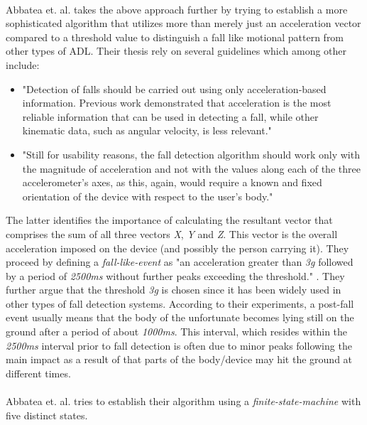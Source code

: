 \documentclass[12pt, a4paper, onecolumn]{article}
\begin{document}
	
	\paragraph{} Abbatea et. al. takes the above approach further by trying to establish a more sophisticated algorithm that utilizes more than merely just an acceleration vector compared to a threshold value to distinguish a fall like motional pattern from other types of ADL. Their thesis rely on several guidelines which among other include: 
	\begin{itemize} 
		\item "Detection of falls should be carried out using only acceleration-based information. Previous work demonstrated that acceleration is the most reliable information that can be used in detecting a fall, while other kinematic data, such as angular velocity, is less relevant." \cite[p~3]{piza_uni}
		
		\item "Still for usability reasons, the fall detection algorithm should work only with the magnitude of acceleration and not with the values along each of the three accelerometer’s axes, as this, again, would require a known and fixed orientation of the device with respect to the user’s body." \cite[p~3]{piza_uni}
	\end{itemize}
	
	The latter identifies the importance of calculating the resultant vector that comprises the sum of all three vectors \textit{X}, \textit{Y} and \textit{Z}. This vector is the overall acceleration imposed on the device (and possibly the person carrying it). They proceed by defining a \textit{fall-like-event} as "an acceleration greater than \textit{3g} followed by a period of \textit{2500ms} without further peaks exceeding the threshold." \cite[p~5]{piza_uni}. They further argue that the threshold \textit{3g} is chosen since it has been widely used in other types of fall detection systems. According to their experiments, a post-fall event usually means that the body of the unfortunate becomes lying still on the ground after a period of about \textit{1000ms}. This interval, which resides within the \textit{2500ms} interval prior to fall detection is often due to minor peaks following the main impact as a result of that parts of the body/device may hit the ground at different times. 
	
	\paragraph{} Abbatea et. al. tries to establish their algorithm using a \textit{finite-state-machine} with five distinct states.
	
\end{document}
